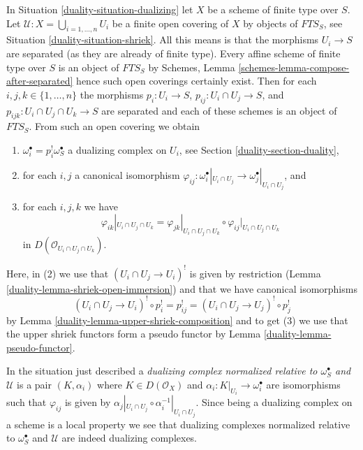 In Situation \ref{duality-situation-dualizing} let $X$ be a scheme of finite type
over $S$. Let $\mathcal{U} : X = \bigcup_{i = 1, \ldots, n} U_i$
be a finite open covering of $X$ by objects of $\textit{FTS}_S$, see
Situation \ref{duality-situation-shriek}. All this means is that the morphisms
$U_i \to S$ are separated (as they are already of finite type).
Every affine scheme of finite type over $S$ is an object of $\textit{FTS}_S$
by Schemes, Lemma \ref{schemes-lemma-compose-after-separated}
hence such open coverings certainly exist.
Then for each $i, j, k \in \{1, \ldots, n\}$
the morphisms $p_i : U_i \to S$, $p_{ij} : U_i \cap U_j \to S$,
and $p_{ijk} : U_i \cap U_j \cap U_k \to S$ are separated and
each of these schemes is an object of $\textit{FTS}_S$.
From such an open covering we obtain
\begin{enumerate}
\item $\omega_i^\bullet = p_i^!\omega_S^\bullet$
a dualizing complex on $U_i$, see Section \ref{duality-section-duality},
\item for each $i, j$ a canonical isomorphism
$\varphi_{ij} :
\omega_i^\bullet|_{U_i \cap U_j} \to \omega_j^\bullet|_{U_i \cap U_j}$, and
\item
\label{duality-item-cocycle-glueing}
for each $i, j, k$ we have
$$
\varphi_{ik}|_{U_i \cap U_j \cap U_k} =
\varphi_{jk}|_{U_i \cap U_j \cap U_k} \circ
\varphi_{ij}|_{U_i \cap U_j \cap U_k}
$$
in $D(\mathcal{O}_{U_i \cap U_j \cap U_k})$.
\end{enumerate}
Here, in (2) we use that $(U_i \cap U_j \to U_i)^!$
is given by restriction (Lemma \ref{duality-lemma-shriek-open-immersion})
and that we have canonical isomorphisms
$$
(U_i \cap U_j \to U_i)^! \circ p_i^! = p_{ij}^! =
(U_i \cap U_j \to U_j)^! \circ p_j^!
$$
by Lemma \ref{duality-lemma-upper-shriek-composition} and to get (3) we use
that the upper shriek functors form a pseudo functor by
Lemma \ref{duality-lemma-pseudo-functor}.

\medskip\noindent
In the situation just described a
{\it dualizing complex normalized relative to $\omega_S^\bullet$
and $\mathcal{U}$} is a pair $(K, \alpha_i)$ where $K \in D(\mathcal{O}_X)$
and $\alpha_i : K|_{U_i} \to \omega_i^\bullet$ are isomorphisms
such that $\varphi_{ij}$ is given by
$\alpha_j|_{U_i \cap U_j} \circ \alpha_i^{-1}|_{U_i \cap U_j}$.
Since being a dualizing complex on a scheme is a local property
we see that dualizing complexes normalized relative to $\omega_S^\bullet$
and $\mathcal{U}$ are indeed dualizing complexes.

